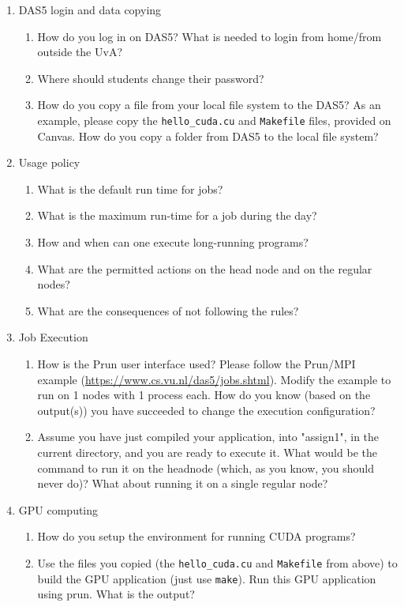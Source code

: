 \documentclass[parskip]{scrartcl}
\begin{document}
\begin{enumerate}
\item DAS5 login and data copying
    \begin{enumerate}
    \item How do you log in on DAS5? What is needed to login from home/from outside the UvA? 
    \item Where should students change their password?
    \item How do you copy a file from your local file system to the DAS5? As an example, please copy the \texttt{hello\_cuda.cu} and \texttt{Makefile} files, provided on Canvas. How do you copy a folder from DAS5 to the local file system?  
    \end{enumerate}
    
\item Usage policy
    \begin{enumerate}
    \item What is the default run time for jobs?
    \item What is the maximum run-time for a job during the day?  
    \item How and when can one execute long-running programs?
    \item What are the permitted actions on the head node and on the regular nodes?  
    \item What are the consequences of not following the rules?
    \end{enumerate}

\item Job Execution
    \begin{enumerate}
    \item How is the Prun user interface used? Please follow the Prun/MPI example (\url{https://www.cs.vu.nl/das5/jobs.shtml}). Modify the example to run on 1 nodes with 1 process each. How do you know (based on the output(s)) you have succeeded to change the execution configuration? 
    \item Assume you have just compiled your application, into "assign1", in the current directory, and you are ready to execute it. What would be the command to run it on the headnode (which, as you know, you should never do)? What about running it on a single regular node?  
    \end{enumerate}
    
\item GPU computing 
    \begin{enumerate}
    \item How do you setup the environment for running CUDA programs?
    \item Use the files you copied (the \texttt{hello\_cuda.cu} and \texttt{Makefile} from above) to build the GPU application (just use \texttt{make}). Run this GPU application using prun. What is the output?   
    \end{enumerate}
\end{enumerate}
\end{document}
